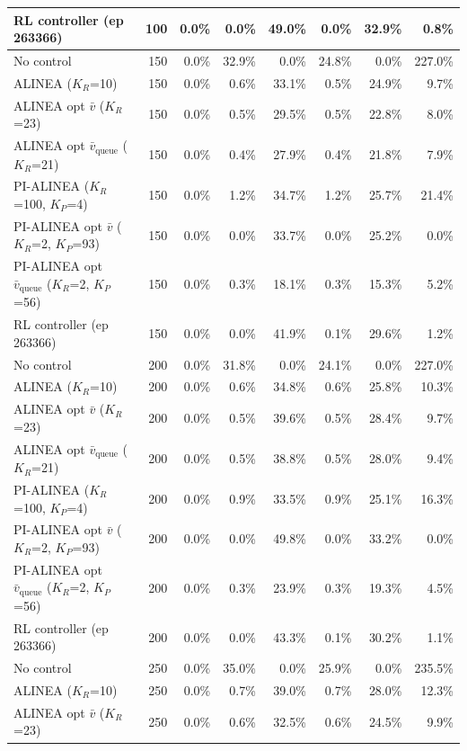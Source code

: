 \begin{longtable}{p{5.2cm}rrrrrrr}
RL controller (ep 263366) & 100 & 0.0\% & 0.0\% & 49.0\% & 0.0\% & 32.9\% & 0.8\% \\
\midrule
No control & 150 & 0.0\% & 32.9\% & 0.0\% & 24.8\% & 0.0\% & 227.0\% \\
ALINEA ($K_R$=10) & 150 & 0.0\% & 0.6\% & 33.1\% & 0.5\% & 24.9\% & 9.7\% \\
ALINEA opt $\bar{v}$ ($K_R$=23) & 150 & 0.0\% & 0.5\% & 29.5\% & 0.5\% & 22.8\% & 8.0\% \\
ALINEA opt $\bar{v}_{\mathrm{queue}}$ ($K_R$=21) & 150 & 0.0\% & 0.4\% & 27.9\% & 0.4\% & 21.8\% & 7.9\% \\
PI-ALINEA ($K_R$=100, $K_P$=4) & 150 & 0.0\% & 1.2\% & 34.7\% & 1.2\% & 25.7\% & 21.4\% \\
PI-ALINEA opt $\bar{v}$ ($K_R$=2, $K_P$=93) & 150 & 0.0\% & 0.0\% & 33.7\% & 0.0\% & 25.2\% & 0.0\% \\
PI-ALINEA opt $\bar{v}_{\mathrm{queue}}$ ($K_R$=2, $K_P$=56) & 150 & 0.0\% & 0.3\% & 18.1\% & 0.3\% & 15.3\% & 5.2\% \\
RL controller (ep 263366) & 150 & 0.0\% & 0.0\% & 41.9\% & 0.1\% & 29.6\% & 1.2\% \\
\midrule
No control & 200 & 0.0\% & 31.8\% & 0.0\% & 24.1\% & 0.0\% & 227.0\% \\
ALINEA ($K_R$=10) & 200 & 0.0\% & 0.6\% & 34.8\% & 0.6\% & 25.8\% & 10.3\% \\
ALINEA opt $\bar{v}$ ($K_R$=23) & 200 & 0.0\% & 0.5\% & 39.6\% & 0.5\% & 28.4\% & 9.7\% \\
ALINEA opt $\bar{v}_{\mathrm{queue}}$ ($K_R$=21) & 200 & 0.0\% & 0.5\% & 38.8\% & 0.5\% & 28.0\% & 9.4\% \\
PI-ALINEA ($K_R$=100, $K_P$=4) & 200 & 0.0\% & 0.9\% & 33.5\% & 0.9\% & 25.1\% & 16.3\% \\
PI-ALINEA opt $\bar{v}$ ($K_R$=2, $K_P$=93) & 200 & 0.0\% & 0.0\% & 49.8\% & 0.0\% & 33.2\% & 0.0\% \\
PI-ALINEA opt $\bar{v}_{\mathrm{queue}}$ ($K_R$=2, $K_P$=56) & 200 & 0.0\% & 0.3\% & 23.9\% & 0.3\% & 19.3\% & 4.5\% \\
RL controller (ep 263366) & 200 & 0.0\% & 0.0\% & 43.3\% & 0.1\% & 30.2\% & 1.1\% \\
\midrule
No control & 250 & 0.0\% & 35.0\% & 0.0\% & 25.9\% & 0.0\% & 235.5\% \\
ALINEA ($K_R$=10) & 250 & 0.0\% & 0.7\% & 39.0\% & 0.7\% & 28.0\% & 12.3\% \\
ALINEA opt $\bar{v}$ ($K_R$=23) & 250 & 0.0\% & 0.6\% & 32.5\% & 0.6\% & 24.5\% & 9.9\% \\

\end{longtable}
